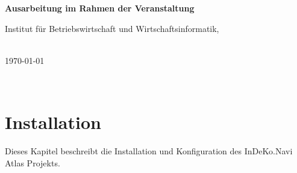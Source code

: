 \begin{titlepage}
\begin{figure}
\begin{minipage}{0.2\textwidth}
\begin{flushleft}
        \end{flushleft}
    \end{minipage} 
    \vspace{4cm}
\end{figure}
\begin{center}
    
    \Huge{\textbf{\titel}}
    
    \Huge{\textbf{\untertitel}}
    \vspace{2cm}
\end{center}
\begin{center}
    \vspace*{0cm}
    \textbf{Ausarbeitung im Rahmen der Veranstaltung \veranstaltung}
    \vspace{1cm}
\end{center}
\begin{center}
    Institut für Betriebswirtschaft und Wirtschaftsinformatik,
    
    \arbeitsgruppe
\end{center}
\begin{center}
    \vspace{5cm}
    \autor\\
    
    
    \today
\end{center}
\end{titlepage}
\newpage


\tableofcontents 



\restoregeometry
\newpage
{}


\section{Installation}
Dieses Kapitel beschreibt die Installation und Konfiguration des InDeKo.Navi Atlas Projekts.


